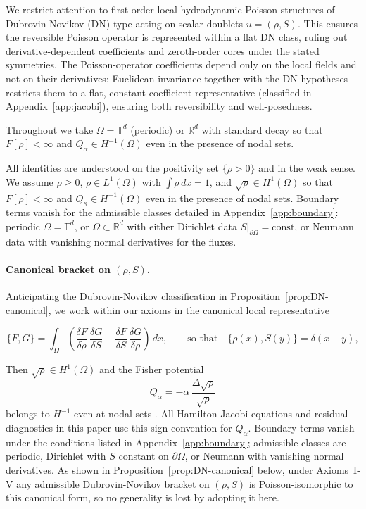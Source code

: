 \documentclass[11pt,a4paper]{article}
\numberwithin{equation}{section}
\theoremstyle{thmcompact}
\theoremstyle{remark}
\begin{document}
We restrict attention to first-order local hydrodynamic Poisson structures of Dubrovin-Novikov (DN) type \citep{Dubrovin1983, novikov1984} acting on scalar doublets $u=(\rho,S)$. This ensures the reversible Poisson operator is represented within a flat DN class, ruling out derivative-dependent coefficients and zeroth-order cores under the stated symmetries.
The Poisson-operator coefficients depend only on the local fields and not on their derivatives; Euclidean invariance together with the DN hypotheses restricts them to a flat, constant-coefficient representative (classified in Appendix~\ref{app:jacobi}), ensuring both reversibility and well-posedness.

Throughout we take $\Omega=\mathbb{T}^d$ (periodic) or $\mathbb{R}^d$ with standard decay so that $F[\rho]<\infty$ and $Q_{\alpha}\in H^{-1}(\Omega)$ even in the presence of nodal sets.

All identities are understood on the positivity set $\{\rho>0\}$ and in the weak sense. We assume $\rho\ge0$, $\rho\in L^{1}(\Omega)$ with $\int\rho\,dx=1$, and $\sqrt{\rho}\in H^{1}(\Omega)$ so that $F[\rho]<\infty$ and $Q_{\kappa}\in H^{-1}(\Omega)$ even in the presence of nodal sets. Boundary terms vanish for the admissible classes detailed in Appendix~\ref{app:boundary}: periodic $\Omega=\mathbb T^{d}$, or $\Omega\subset\mathbb R^{d}$ with either Dirichlet data $S|_{\partial\Omega}=\mathrm{const}$, or Neumann data with vanishing normal derivatives for the fluxes.
	
\paragraph{Canonical bracket on $(\rho,S)$.}
Anticipating the Dubrovin-Novikov classification in Proposition~\ref{prop:DN-canonical}, we work within our axioms in the canonical local representative

\[
\{F,G\}=\int_{\Omega}\!\left(\frac{\delta F}{\delta \rho}\,\frac{\delta G}{\delta S}
-\frac{\delta F}{\delta S}\,\frac{\delta G}{\delta \rho}\right)\,dx,
\qquad\text{so that}\quad
\{\rho(x),S(y)\}=\delta(x-y),
\]
	
Then $\sqrt{\rho}\in H^1(\Omega)$ and the Fisher potential
\[
Q_\alpha=-\alpha\,\frac{\Delta\sqrt{\rho}}{\sqrt{\rho}}
\]
belongs to $H^{-1}$ even at nodal sets \citep{hall2002, reginatto1998}. All Hamilton-Jacobi equations and residual diagnostics in this paper use this sign convention for $Q_\alpha$. Boundary terms vanish under the conditions listed in Appendix~\ref{app:boundary}; admissible classes are periodic, Dirichlet with $S$ constant on $\partial\Omega$, or Neumann with vanishing normal derivatives. As shown in Proposition~\ref{prop:DN-canonical} below, under Axioms~I-V any admissible Dubrovin-Novikov bracket on $(\rho,S)$ is Poisson-isomorphic to this canonical form, so no generality is lost by adopting it here.
\end{document}
